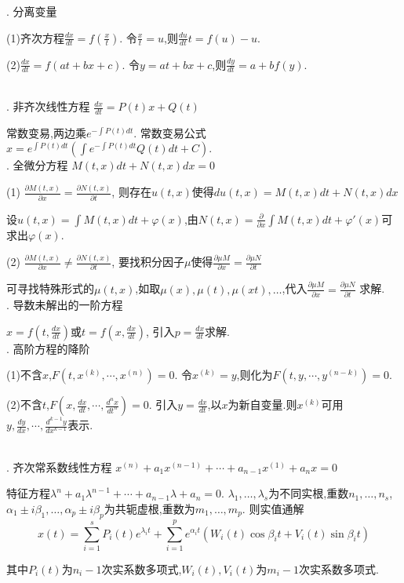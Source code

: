 \documentclass[UTF8]{ctexart}
\begin{document}
. 分离变量 \par 
(1)齐次方程$\frac{dx}{dt}=f(\frac{x}{t})$. 令$\frac{x}{t}=u$,则$\frac{du}{dt}t=f(u)-u$.\par 
(2)$\frac{dx}{dt}=f(at+bx+c)$. 令$y=at+bx+c$,则$\frac{dy}{dt}=a+bf(y)$.\par 
~\\

. 非齐次线性方程 $\frac{dx}{dt}=P(t)x+Q(t)$\par 
常数变易,两边乘$e^{-\int P(t)dt}$. 常数变易公式$x=e^{\int P(t)dt}(\int e^{-\int P(t)dt}Q(t)dt+C)$.
~\\


. 全微分方程 $M(t,x)dt+N(t,x)dx=0$ \par 
(1) $\frac{\partial M(t,x)}{\partial x}=\frac{\partial N(t,x)}{\partial t}$, 则存在$u(t,x)$使得$du(t,x)=M(t,x)dt+N(t,x)dx$\par 
设$u(t,x)=\int M(t,x)dt+\varphi(x)$,由$N(t,x)=\frac{\partial }{\partial x}\int M(t,x)dt+\varphi'(x)$可求出$\varphi(x)$. \par 
(2) $\frac{\partial M(t,x)}{\partial x} \neq \frac{\partial N(t,x)}{\partial t}$, 
要找积分因子$\mu$使得$\frac{\partial \mu M}{\partial x}=\frac{\partial \mu N}{\partial t}$ \par 
可寻找特殊形式的$\mu(t,x) $,如取$\mu (x),\mu (t),\mu (xt),\dots $,代入$\frac{\partial \mu M}{\partial x}=\frac{\partial \mu N}{\partial t}$ 求解.
~\\


. 导数未解出的一阶方程 \par 
$x=f(t,\frac{dx}{dt})$或$t=f(x,\frac{dx}{dt})$,
引入$p=\frac{dx}{dt}$求解.
~\\


. 高阶方程的降阶 \par 
(1)不含$x$,$F\left(t, x^{(k)}, \cdots, x^{(n)}\right)=0$.
令$x^{(k)}=y$,则化为$F\left(t, y, \cdots, y^{(n-k)}\right)=0 $.\par 
(2)不含$t$,$F\left(x, \frac{d x}{d t}, \cdots, \frac{d^{n} x}{d t^{n}}\right)=0$.
引入$y=\frac{dx}{dt}$,以$x$为新自变量.则$x^{(k)}$可用$y,\frac{dy}{dx},\cdots,\frac{d^{k-1}y}{dx^{k-1}}$表示.\par 
~\\

. 齐次常系数线性方程
$x^{(n)}+a_1x^{(n-1)}+\cdots +a_{n-1}x^{(1)}+a_nx=0$ \par 
特征方程$\lambda ^{n}+a_1\lambda^{n-1}+\cdots +a_{n-1}\lambda+a_n=0$.
$\lambda_1,\dots ,\lambda_s$为不同实根,重数$n_1,\dots ,n_s$,
$\alpha_1 \pm i\beta_1,\dots ,\alpha_p \pm i\beta_p$为共轭虚根,重数为$m_1,\dots ,m_p$.
则实值通解$$x(t)=\sum_{i=1}^s P_i(t)e^{\lambda_i t} + \sum_{i=1}^p e^{\alpha_i t}(W_i(t)\cos \beta_i t +V_i(t) \sin\beta_i t)$$ \par 
其中$P_i(t)$为$n_i-1$次实系数多项式,$W_i(t),V_i(t)$为$m_i-1$次实系数多项式.
~\\
\end{document}
